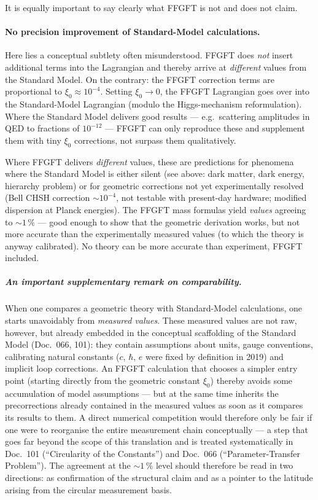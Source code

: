 It is equally important to say clearly what FFGFT is not and does
not claim.

\paragraph{No precision improvement of Standard-Model calculations.}
Here lies a conceptual subtlety often misunderstood. FFGFT does
\emph{not} insert additional terms into the Lagrangian and thereby
arrive at \emph{different} values from the Standard Model. On the
contrary: the FFGFT correction terms are proportional to
$\xi_0 \approx 10^{-4}$. Setting $\xi_0 \to 0$, the FFGFT
Lagrangian goes over into the Standard-Model Lagrangian (modulo the
Higgs-mechanism reformulation). Where the Standard Model delivers
good results --- e.g.\ scattering amplitudes in QED to fractions
of $10^{-12}$ --- FFGFT can only reproduce these and supplement
them with tiny $\xi_0$ corrections, not surpass them qualitatively.

Where FFGFT delivers \emph{different} values, these are predictions
for phenomena where the Standard Model is either silent (see above:
dark matter, dark energy, hierarchy problem) or for geometric
corrections not yet experimentally resolved (Bell CHSH correction
$\sim 10^{-4}$, not testable with present-day hardware; modified
dispersion at Planck energies). The FFGFT
mass formulas yield \emph{values} agreeing to $\sim 1\,\%$ ---
good enough to show that the geometric derivation works, but not
more accurate than the experimentally measured values (to which
the theory is anyway calibrated). No theory can be more accurate
than experiment, FFGFT included.

\subparagraph{An important supplementary remark on comparability.}
When one compares a geometric theory with Standard-Model
calculations, one starts unavoidably from \emph{measured values}.
These measured values are not raw, however, but already embedded
in the conceptual scaffolding of the Standard Model (Doc.~066, 101):
they contain assumptions about units, gauge conventions, calibrating
natural constants ($c$, $\hbar$, $e$ were fixed by definition in
2019) and implicit loop corrections. An FFGFT calculation that
chooses a simpler entry point (starting directly from the geometric
constant $\xi_0$) thereby avoids some accumulation of model
assumptions --- but at the same time inherits the precorrections
already contained in the measured values as soon as it compares its
results to them. A direct numerical competition would therefore
only be fair if one were to reorganise the entire measurement chain
conceptually --- a step that goes far beyond the scope of this
translation and is treated systematically in Doc.~101
(\enquote{Circularity of the Constants}) and Doc.~066
(\enquote{Parameter-Transfer Problem}). The agreement at the
$\sim 1\,\%$ level should therefore be read in two directions: as
confirmation of the structural claim and as a pointer to the latitude
arising from the circular measurement basis.

